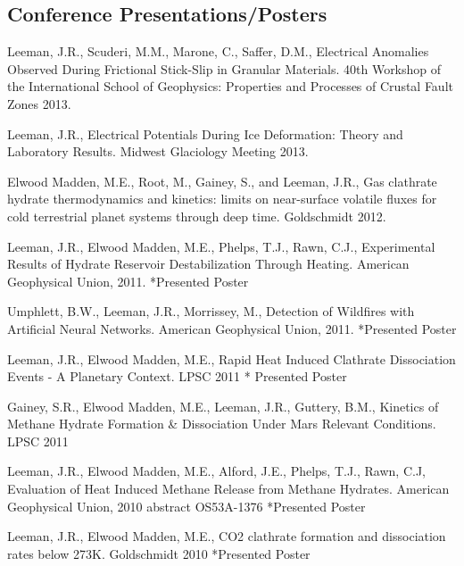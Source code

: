 \documentclass[letterpaper]{article}
\renewenvironment{itemize}{
  \begin{list}{}{
    \setlength{\leftmargin}{1.5em}
  }
}{
  \end{list}
}
\begin{document}
\subsection*{Conference Presentations/Posters}

\begin{itemize}

\item Leeman, J.R., Scuderi, M.M., Marone, C., Saffer, D.M., Electrical Anomalies Observed During Frictional Stick-Slip in Granular Materials.  40th Workshop of the International School of Geophysics: Properties and Processes of Crustal Fault Zones 2013.

\item Leeman, J.R., Electrical Potentials During Ice Deformation: Theory and Laboratory Results.  Midwest Glaciology Meeting 2013.  

\item Elwood Madden, M.E., Root, M., Gainey, S., and Leeman, J.R., Gas clathrate hydrate thermodynamics and kinetics: limits on near-surface volatile fluxes for cold terrestrial planet systems through deep time.  Goldschmidt 2012.

\item Leeman, J.R., Elwood Madden, M.E., Phelps, T.J., Rawn, C.J.,  Experimental Results of Hydrate Reservoir Destabilization Through Heating. American Geophysical Union, 2011.  *Presented Poster

\item Umphlett, B.W., Leeman, J.R., Morrissey, M.,  Detection of Wildfires with Artificial Neural Networks. American Geophysical Union, 2011.  *Presented Poster

\item Leeman, J.R., Elwood Madden, M.E., Rapid Heat Induced Clathrate Dissociation Events - A Planetary Context. LPSC 2011 * Presented Poster

\item  Gainey, S.R., Elwood Madden, M.E., Leeman, J.R., Guttery, B.M., Kinetics of Methane Hydrate Formation \& Dissociation Under Mars Relevant Conditions. LPSC 2011 

\item Leeman, J.R., Elwood Madden, M.E., Alford, J.E., Phelps, T.J., Rawn, C.J, Evaluation of Heat Induced Methane Release from Methane Hydrates. American Geophysical Union, 2010 abstract OS53A-1376 *Presented Poster

\item Leeman, J.R., Elwood Madden, M.E., CO2 clathrate formation and dissociation rates below 273K. Goldschmidt 2010 *Presented Poster


\end{itemize}
\end{document}
